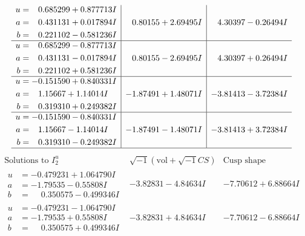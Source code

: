 \documentclass[1p]{elsarticle_modified}
\theoremstyle{definition}
\newcommand{\I}{\sqrt{-1}}
\begin{document}
$$\begin{array}{c|c|c}
\begin{aligned}
u &= \phantom{-}0.685299 + 0.877713 I \\
a &= \phantom{-}0.431131 + 0.017894 I \\
b &= \phantom{-}0.221102 - 0.581236 I\end{aligned}
 & \phantom{-}0.80155 + 2.69495 I & \phantom{-}4.30397 - 0.26494 I \\ \hline\begin{aligned}
u &= \phantom{-}0.685299 - 0.877713 I \\
a &= \phantom{-}0.431131 - 0.017894 I \\
b &= \phantom{-}0.221102 + 0.581236 I\end{aligned}
 & \phantom{-}0.80155 - 2.69495 I & \phantom{-}4.30397 + 0.26494 I \\ \hline\begin{aligned}
u &= -0.151590 + 0.840331 I \\
a &= \phantom{-}1.15667 + 1.14014 I \\
b &= \phantom{-}0.319310 + 0.249382 I\end{aligned}
 & -1.87491 + 1.48071 I & -3.81413 - 3.72384 I \\ \hline\begin{aligned}
u &= -0.151590 - 0.840331 I \\
a &= \phantom{-}1.15667 - 1.14014 I \\
b &= \phantom{-}0.319310 - 0.249382 I\end{aligned}
 & -1.87491 - 1.48071 I & -3.81413 + 3.72384 I\\
 \hline 
 \end{array}$$\newpage$$\begin{array}{c|c|c}  
\text{Solutions to }I^u_{2}& \I (\text{vol} + \sqrt{-1}CS) & \text{Cusp shape}\\
 \hline 
\begin{aligned}
u &= -0.479231 + 1.064790 I \\
a &= -1.79535 - 0.55808 I \\
b &= \phantom{-}0.350575 - 0.499346 I\end{aligned}
 & -3.82831 - 4.84634 I & -7.70612 + 6.88664 I \\ \hline\begin{aligned}
u &= -0.479231 - 1.064790 I \\
a &= -1.79535 + 0.55808 I \\
b &= \phantom{-}0.350575 + 0.499346 I\end{aligned}
 & -3.82831 + 4.84634 I & -7.70612 - 6.88664 I \\ \hline\begin{aligned}

\end{aligned}
\end{array}$$
\end{document}
